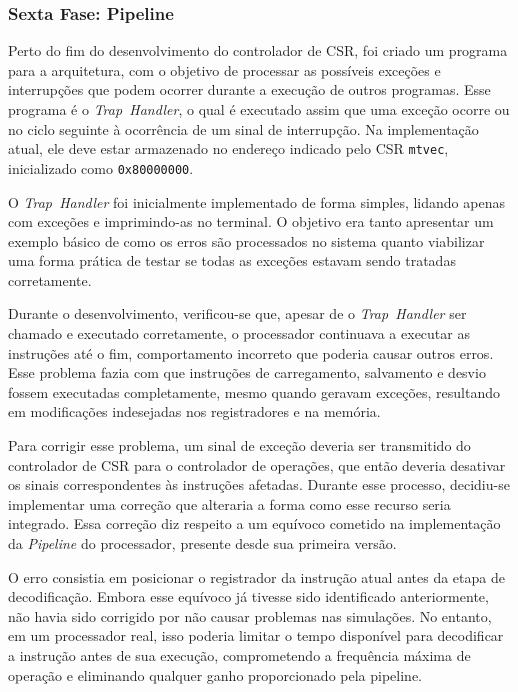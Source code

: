 \documentclass[
	12pt,				%
	openright,			%
	oneside,			%
	a4paper,			%
	english,			%
	french,				%
	spanish,			%
	brazil,				%
	]{abntex2}
\begin{document}
\subsubsection{Sexta Fase: Pipeline}

Perto do fim do desenvolvimento do controlador de CSR, foi criado um programa para a arquitetura, com o objetivo de processar as possíveis exceções e interrupções que podem ocorrer durante a execução de outros programas. Esse programa é o \textit{Trap~Handler}, o qual é executado assim que uma exceção ocorre ou no ciclo seguinte à ocorrência de um sinal de interrupção. Na implementação atual, ele deve estar armazenado no endereço indicado pelo CSR \texttt{mtvec}, inicializado como \texttt{0x80000000}.

O \textit{Trap~Handler} foi inicialmente implementado de forma simples, lidando apenas com exceções e imprimindo-as no terminal. O objetivo era tanto apresentar um exemplo básico de como os erros são processados no sistema quanto viabilizar uma forma prática de testar se todas as exceções estavam sendo tratadas corretamente.

Durante o desenvolvimento, verificou-se que, apesar de o \textit{Trap~Handler} ser chamado e executado corretamente, o processador continuava a executar as instruções até o fim, comportamento incorreto que poderia causar outros erros. Esse problema fazia com que instruções de carregamento, salvamento e desvio fossem executadas completamente, mesmo quando geravam exceções, resultando em modificações indesejadas nos registradores e na memória.

Para corrigir esse problema, um sinal de exceção deveria ser transmitido do controlador de CSR para o controlador de operações, que então deveria desativar os sinais correspondentes às instruções afetadas. Durante esse processo, decidiu-se implementar uma correção que alteraria a forma como esse recurso seria integrado. Essa correção diz respeito a um equívoco cometido na implementação da \textit{Pipeline} do processador, presente desde sua primeira versão.

O erro consistia em posicionar o registrador da instrução atual antes da etapa de decodificação. Embora esse equívoco já tivesse sido identificado anteriormente, não havia sido corrigido por não causar problemas nas simulações. No entanto, em um processador real, isso poderia limitar o tempo disponível para decodificar a instrução antes de sua execução, comprometendo a frequência máxima de operação e eliminando qualquer ganho proporcionado pela pipeline.
\end{document}
